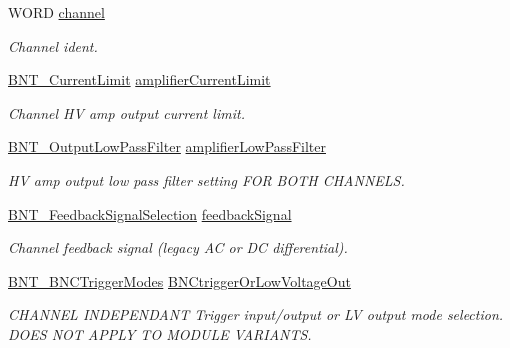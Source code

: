 \begin{DoxyCompactItemize}
\item 
W\+O\+RD \hyperlink{struct_b_n_t___i_o___settings_a0c5147c03530fbd73f754474cd8dedd9}{channel}
\begin{DoxyCompactList}\small\item\em Channel ident. \end{DoxyCompactList}\item 
\hyperlink{group___benchtop_nano_trak_ga7749f98a6108f8dec37d05130cfdd1d3}{B\+N\+T\+\_\+\+Current\+Limit} \hyperlink{struct_b_n_t___i_o___settings_ab319f94be77bd0f6ca938d5cdae6b72d}{amplifier\+Current\+Limit}
\begin{DoxyCompactList}\small\item\em Channel HV amp output current limit. \end{DoxyCompactList}\item 
\hyperlink{group___benchtop_nano_trak_ga656843cc1b280c9864ca3147a02a02f8}{B\+N\+T\+\_\+\+Output\+Low\+Pass\+Filter} \hyperlink{struct_b_n_t___i_o___settings_a7f49688b00fa9bfedc930cd9c146a9ff}{amplifier\+Low\+Pass\+Filter}
\begin{DoxyCompactList}\small\item\em HV amp output low pass filter setting F\+OR B\+O\+TH C\+H\+A\+N\+N\+E\+LS. \end{DoxyCompactList}\item 
\hyperlink{group___benchtop_nano_trak_ga19553dc0b7ed1b4f7d24cf074673b78e}{B\+N\+T\+\_\+\+Feedback\+Signal\+Selection} \hyperlink{struct_b_n_t___i_o___settings_a0d357ff43ca3327996b6029d27f8e69c}{feedback\+Signal}
\begin{DoxyCompactList}\small\item\em Channel feedback signal (legacy AC or DC differential). \end{DoxyCompactList}\item 
\hyperlink{group___benchtop_nano_trak_gafcd5eb62b69ae1842a900947e0d1aac3}{B\+N\+T\+\_\+\+B\+N\+C\+Trigger\+Modes} \hyperlink{struct_b_n_t___i_o___settings_a3eae90a1bd8ef2a50889486693e08ce4}{B\+N\+Ctrigger\+Or\+Low\+Voltage\+Out}
\begin{DoxyCompactList}\small\item\em C\+H\+A\+N\+N\+EL I\+N\+D\+E\+P\+E\+N\+D\+A\+NT Trigger input/output or LV output mode selection. D\+O\+ES N\+OT A\+P\+P\+LY TO M\+O\+D\+U\+LE V\+A\+R\+I\+A\+N\+TS. \end{DoxyCompactList}\end{DoxyCompactItemize}


